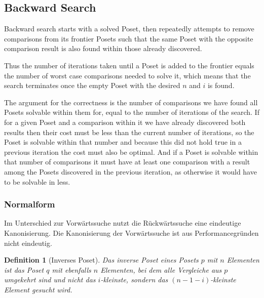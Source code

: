 \documentclass[10pt,journal,compsoc]{IEEEtran}
\newtheorem{definition}{Definition}
\begin{document}
\subsection{Backward Search} \label{sec:backward}

Backward search starts with a solved Poset, then repeatedly attempts to remove comparisons from its
frontier Posets such that the same Poset with the opposite comparison result is also found within
those already discovered.

Thus the number of iterations taken until a Poset is added to the frontier equals the number of
worst case comparisons needed to solve it, which means that the search terminates once the empty
Poset with the desired $n$ and $i$ is found.

The argument for the correctness is the number of comparisons we have found all Posets solvable
within them for, equal to the number of iterations of the search. If for a given Poset and a
comparison within it we have already discovered both results then their cost must be less than the
current number of iterations, so the Poset is solvable within that number and because this did not
hold true in a previous iteration the cost must also be optimal. And if a Poset is solvable within
that number of comparisons it must have at least one comparison with a result among the Posets
discovered in the previous iteration, as otherwise it would have to be solvable in less.



\subsubsection{Normalform} \label{sec:backward:normal_form}

Im Unterschied zur Vorwärtssuche nutzt die Rückwärtssuche eine eindeutige Kanonisierung.
Die Kanonisierung der Vorwärtssuche ist aus Performancegründen nicht eindeutig.

\begin{definition}[Inverses Poset] \label{definition:inverse_poset}
  Das inverse Poset eines Posets $p$ mit $n$ Elementen ist das Poset $q$ mit ebenfalls $n$ Elementen, bei dem alle Vergleiche aus $p$ umgekehrt sind und nicht das $i$-kleinste, sondern das $(n - 1 - i)$-kleinste Element gesucht wird.
\end{definition}
\end{document}
